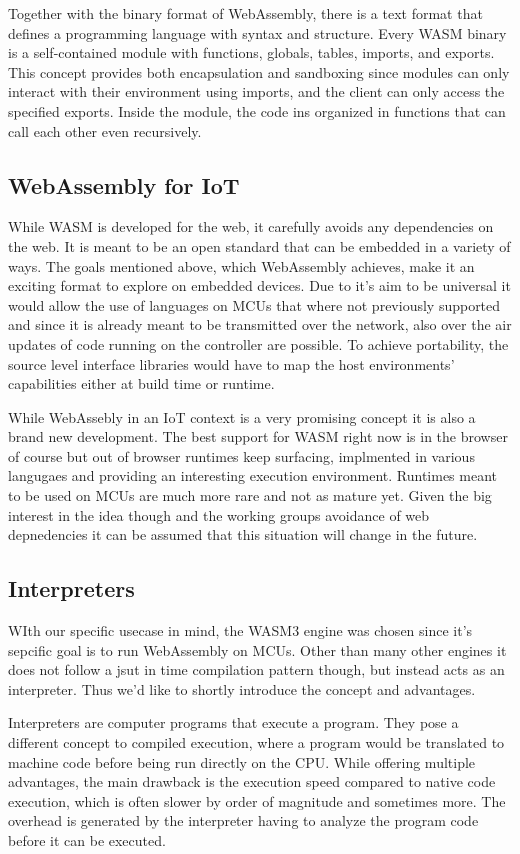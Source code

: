Together with the binary format of WebAssembly, there is a text format that defines a programming language with syntax and structure. Every WASM binary is a self-contained module with functions, globals, tables, imports, and exports. This concept provides both encapsulation and sandboxing since modules can only interact with their environment using imports, and the client can only access the specified exports. Inside the module, the code ins organized in functions that can call each other even recursively.
\subsection{WebAssembly for IoT}
While WASM is developed for the web, it carefully avoids any dependencies on the web. It is meant to be an open standard that can be embedded in a variety of ways. The goals mentioned above, which WebAssembly achieves, make it an exciting format to explore on embedded devices. Due to it's aim to be universal it would allow the use of languages on MCUs that where not previously supported and since it is already meant to be transmitted over the network, also over the air updates of code running on the controller are possible. To achieve portability, the source level interface libraries would have to map the host environments' capabilities either at build time or runtime.

While WebAssebly in an IoT context is a very promising concept it is also a brand new development. The best support for WASM right now is in the browser of course but out of browser runtimes keep surfacing, implmented in various langugaes and providing an interesting execution environment. Runtimes meant to be used on MCUs are much more rare and not as mature yet. Given the big interest in the idea though and the working groups avoidance of web depnedencies it can be assumed that this situation will change in the future.
\subsection{Interpreters}
WIth our specific usecase in mind, the WASM3 engine was chosen since it's sepcific goal is to run WebAssembly on MCUs. Other than many other engines it does not follow a jsut in time compilation pattern though, but instead acts as an interpreter. Thus we'd like to shortly introduce the concept and advantages.

Interpreters are computer programs that execute a program. They pose a different concept to compiled execution, where a program would be translated to machine code before being run directly on the CPU. While offering multiple advantages, the main drawback is the execution speed compared to native code execution, which is often slower by order of magnitude and sometimes more. The overhead is generated by the interpreter having to analyze the program code before it can be executed.

